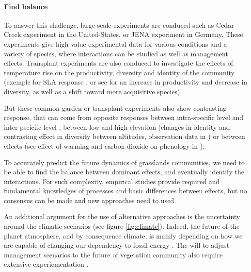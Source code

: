  \paragraph{Find balance}
 
 
 
 To answer this challenge, large scale experiments are conduced such as Cedar Creek experiment in the United-States, or JENA experiment in Germany. These experiments give high value experimental data for various conditions and a variety of species, where interactions can be studied as well as management effects. Transplant experiments are also conduced to investigate the effects of temperature rise on the productivity, diversity and identity of the community (exemple for SLA response \cite{scheepens_genotypic_2010}, or see \cite{debouk_functional_2015} for an increase in productivity and decrease in diversity, as well as a shift toward more acquisitive species).
 
 But these common garden or transplant experiments also show contrasting response, that can come from opposite responses between intra-specific level and inter-pseicifc level \parencite{jung_intraspecific_2014}, between low and high elevation (changes in identity and contrasting effect in diversity between altitudes, observation data in \cite{rosbakh_elevation_2014}) or between effects (see effect of warming and carbon dioxide on phenology in \cite{reyes-fox_five_2016}).
 
 To accurately predict the future dynamics of grasslands communities, we need to be able to find the balance between dominant effects, and eventually identify the interactions. For such complexity, empirical studies provide required and fundamental knowledges of processes and basic differences between effects, but no consensus can be made \parencite{merila_climate_2014} and new approaches need to used.
 
 An additional argument for the use of alternative approaches is the uncertainty around the climatic scenarios (see figure \ref{fig:climate}). Indeed, the future of the planet atmosphere, and by consequence climate, is mainly depending on how we are capable of changing our dependency to fossil energy \parencite{intergovernmental_panel_on_climate_change_climate_2014}. The will to adjust management scenarios to the future of vegetation community \parencite{schipe_multiple_2012} also require extensive experiementation \parencite{rodriguez_lingra-cc:_1999, martin_simulations_2012, deleglise_drought-induced_2015}.
 
